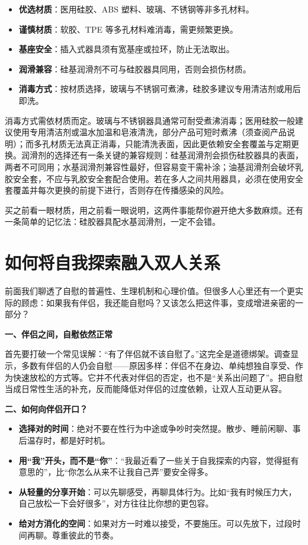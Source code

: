 \documentclass[12pt,UTF8]{ctexbook}
\begin{document}
\begin{itemize}
\item \textbf{优选材质}：医用硅胶、ABS 塑料、玻璃、不锈钢等非多孔材料。
\item \textbf{谨慎材质}：软胶、TPE 等多孔材料难消毒，需更频繁更换。
\item \textbf{基座安全}：插入式器具须有宽基座或拉环，防止无法取出。
\item \textbf{润滑兼容}：硅基润滑剂不可与硅胶器具同用，否则会损伤材质。
\item \textbf{消毒方式}：按材质选择，玻璃与不锈钢可煮沸，硅胶多建议专用清洁剂或用后即洗。
\end{itemize}

消毒方式需依材质而定。玻璃与不锈钢器具通常可耐受煮沸消毒；医用硅胶一般建议使用专用清洁剂或温水加温和皂液清洗，部分产品可短时煮沸（须查阅产品说明）；而多孔材质无法真正消毒，只能清洗表面，因此更依赖安全套覆盖与定期更换。润滑剂的选择还有一条关键的兼容规则：硅基润滑剂会损伤硅胶器具的表面，两者不可同用；水基润滑剂兼容性最好，但容易变干需补涂；油基润滑剂会破坏乳胶安全套，不应与乳胶安全套配合使用。若在多人之间共用器具，必须在使用安全套覆盖并每次更换的前提下进行，否则存在传播感染的风险。

\begin{tcolorbox}[colback=pink!5!white,colframe=red!50!black,title=贴心小叮咛]
买之前看一眼材质，用之前看一眼说明，这两件事能帮你避开绝大多数麻烦。还有一条简单的记忆法：硅胶器具配水基润滑剂，一定不会错。
\end{tcolorbox}

\section{如何将自我探索融入双人关系}

前面我们聊透了自慰的普遍性、生理机制和心理价值。但很多人心里还有一个更实际的顾虑：如果我有伴侣，我还能自慰吗？又该怎么把这件事，变成增进亲密的一部分？

\textbf{一、伴侣之间，自慰依然正常}

首先要打破一个常见误解：“有了伴侣就不该自慰了。”这完全是道德绑架。调查显示，多数有伴侣的人仍会自慰——原因多样：伴侣不在身边、单纯想独自享受、作为快速放松的方式等。它并不代表对伴侣的否定，也不是“关系出问题了”。把自慰当成日常性生活的补充，反而能降低对伴侣的过度依赖，让双人互动更从容。

\textbf{二、如何向伴侣开口？}

\begin{itemize}
\item \textbf{选择对的时间}：绝对不要在性行为中途或争吵时突然提。散步、睡前闲聊、事后温存时，都是好时机。
\item \textbf{用“我”开头，而不是“你”}：“我最近看了一些关于自我探索的内容，觉得挺有意思的”，比“你怎么从来不让我自己弄”要安全得多。
\item \textbf{从轻量的分享开始}：可以先聊感受，再聊具体行为。比如“我有时候压力大，自己放松一下会好很多”，对方往往比你想的更包容。
\item \textbf{给对方消化的空间}：如果对方一时难以接受，不要施压。可以先放下，过段时间再聊。尊重彼此的节奏。
\end{itemize}
\end{document}
